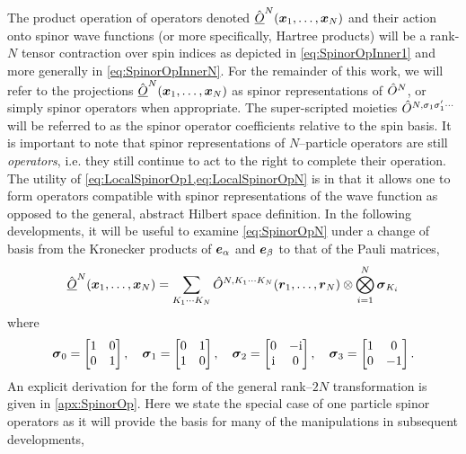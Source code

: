 The product operation of operators denoted $\hat{\underline{O}}^N(\boldsymbol{x}_1,\ldots,\boldsymbol{x}_N)$ and their action onto spinor wave functions 
(or more specifically, Hartree products) will be a rank-$N$ tensor contraction over spin indices as depicted in \cref{eq:SpinorOpInner1} 
and more generally in \cref{eq:SpinorOpInnerN}. 
For the remainder of this work, we will refer to the projections $\hat{\underline{O}}^N(\boldsymbol{x}_1,\ldots,\boldsymbol{x}_N)$ as 
spinor representations of $\hat{O}^N$, or simply spinor operators when appropriate. 
The super-scripted moieties $\hat{O}^{N,\sigma_1\sigma'_1\cdots}$ will be referred to as the spinor operator
coefficients relative to the spin basis.
It is important to note that spinor representations
of $N$--particle operators are still \emph{operators}, i.e. they still continue to act to the right
to complete their operation. The utility of \cref{eq:LocalSpinorOp1,eq:LocalSpinorOpN} is in that it allows one to
form operators compatible with spinor representations of the wave function as opposed to the general, 
abstract Hilbert space definition. 
In the following developments, it will be useful to examine \cref{eq:SpinorOpN} under a change of basis from the Kronecker products of
$\boldsymbol{e}_\alpha$ and $\boldsymbol{e}_\beta$ to that of the Pauli matrices,
\begin{equation}
  \label{eq:SpinorOpPauli}
  \hat{\underline{O}}^N (\boldsymbol{x}_1,\ldots,\boldsymbol{x}_N) = \sum_{K_1\cdots K_N}\hat{O}^{N,K_1\cdots K_N}(\boldsymbol{r}_1,\ldots,\boldsymbol{r}_N) \otimes \bigotimes_{i = 1}^N \boldsymbol{\sigma}_{K_i}
\end{equation}
where 
\begin{equation}
\label{eq:PauliMats}
\boldsymbol{\sigma}_{0} = \begin{bmatrix} 1 & 0 \\ 0 & 1 \end{bmatrix}, \quad
\boldsymbol{\sigma}_{1} = \begin{bmatrix} 0 & 1 \\ 1 & 0 \end{bmatrix}, \quad
\boldsymbol{\sigma}_{2} = \begin{bmatrix} 0 & -\mathrm i \\ \mathrm i & 0 \end{bmatrix}, \quad
\boldsymbol{\sigma}_{3} = \begin{bmatrix} 1 & 0 \\ 0 & -1 \end{bmatrix}.
\end{equation}
An explicit derivation for the form of the general rank--$2N$ transformation is given in \cref{apx:SpinorOp}. Here we state the special case of
one particle spinor operators as it will provide the basis for many of the manipulations in subsequent developments,
